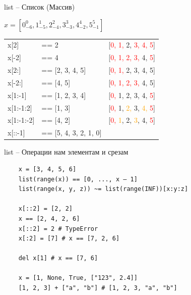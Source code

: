 \documentclass{article}
\begin{document}
\begin{center} list – Список (Массив) \end{center}
{
\Huge
$x = [0_{-6}^{0}, 1_{-5}^{1}, 2_{-4}^{2}, 3_{-3}^{3}, 4_{-2}^{4}, 5_{-1}^{5}]$ \\
\vspace{1cm}
\begin{tabular}{ l l l }
x[2] & == 2 & \hspace{2cm}[\textcolor{red}{0, 1,} 2, \textcolor{red}{3, 4, 5}] \\
x[-2] & == 4 & \hspace{2cm}[\textcolor{red}{0, 1, 2, 3,} 4, \textcolor{red}{5}] \\
x[2:] & == [2, 3, 4, 5] & \hspace{2cm}[\textcolor{red}{0, 1, }2, 3, 4, 5] \\
x[-2:] & == [4, 5] & \hspace{2cm}[\textcolor{red}{0, 1, 2, 3,} 4, 5] \\
x[1:-1] & == [1, 2, 3, 4] & \hspace{2cm}[\textcolor{red}{0,} 1, 2, 3, 4, \textcolor{red}{5}] \\
x[1:-1:2] & == [1, 3] & \hspace{2cm}[\textcolor{red}{0,} 1, \textcolor{orange}{2,} 3, \textcolor{orange}{4,} \textcolor{red}{5}] \\
x[1:-1:-2] & == [4, 2] & \hspace{2cm}[\textcolor{red}{0,} \textcolor{orange}{1}, 2, \textcolor{orange}{3}, 4, \textcolor{red}{5}] \\
x[::-1] & == [5, 4, 3, 2, 1, 0] & \\
\end{tabular}
}
\newpage

\begin{center} list – Операции нам элементам и срезам \end{center}
\vspace{15pt}
\begin{lstlisting}
	x = [3, 4, 5, 6]
	list(range(x)) == [0, ..., x – 1]
	list(range(x, y, z)) ~= list(range(INF))[x:y:z]

	x[::2] = [2, 2]
	x == [2, 4, 2, 6]
	x[::2] = 2 # TypeError
	x[:2] = [7] # x == [7, 2, 6]

	del x[1] # x == [7, 6]

	x = [1, None, True, ["123", 2.4]]
	[1, 2, 3] + ["a", "b"] # [1, 2, 3, "a", "b"]
\end{lstlisting}
\newpage
\end{document}
